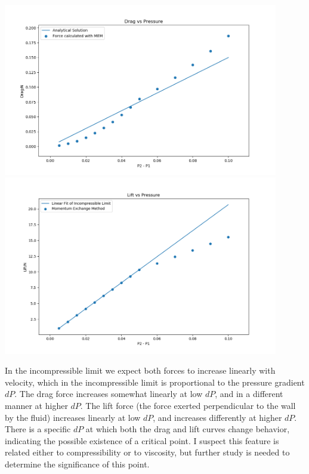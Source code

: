 \documentclass[a4paper]{article}
\begin{document}
\begin{center}
\includegraphics[width=12cm]{channel_2.png}
\includegraphics[width=12cm]{channel_1.png}
\end{center}

In the incompressible limit we expect both forces to increase linearly with velocity, which in the incompressible limit is proportional to the pressure gradient $dP$. The drag force increases somewhat linearly at low $dP$, and in a different manner at higher $dP$. The lift force (the force exerted perpendicular to the wall by the fluid) increases linearly at low $dP$, and increases differently at higher $dP$. There is a specific $dP$ at which both the drag and lift curves change behavior, indicating the possible existence of a critical point. I suspect this feature is related either to compressibility or to viscosity, but further study is needed to determine the significance of this point. 
\end{document}
